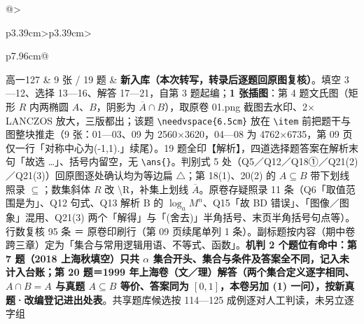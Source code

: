 \documentclass[a4paper,11pt]{article}
\begin{document}
\begin{xltabular}{\textwidth}{@{}>{\raggedright\arraybackslash}p{3.39cm}>{\centering\arraybackslash}p{3.39cm}>{\raggedright\arraybackslash}p{7.96cm}@{}}
高一127 & 9 张 / 19 题 & \textbf{新入库（本次转写，转录后逐题回原图复核）}。填空 3---12、选择 13---16、解答 17---21，自第 3 题起编；\textbf{1 张插图}：第 4 题文氏图（矩形 \(R\) 内两椭圆 \(A\)、\(B\)，阴影为 \(\overline A\cap\allowbreak  B\)），取原卷 01.png 截图去水印、2$\times$ LANCZOS 放大，三版都出；该题 \texttt{\textbackslash{}needvspace\{6.5cm\}} 放在 \texttt{\textbackslash{}item} 前把题干与图整块推走（9 张：01---03、09 为 2560$\times$3620，04---08 为 4762$\times$6735，第 09 页仅一行「对称中心为(-1,1).」续尾）。19 题全印【解析】，四道选择题答案在解析末句「故选 \ldots」、括号内留空，无 \texttt{\textbackslash{}ans\{\}}。判别式 5 处（Q5／Q12／Q18①／Q21(2)／Q21(3)）回原图逐处确认均为等边扁 \(\triangle\)；第 18(1)、20(2) 的 \(A\subseteq\allowbreak  B\) 带下划线照录 \(\subseteq\allowbreak \)；数集斜体 \(R\) 改 \textbackslash R，补集上划线 \(\overline{A}\)。原卷存疑照录 11 条（Q6「取值范围是为」、Q12 句式、Q13 解析 B 的 \(\log_a M^n\)、Q15「故 BD 错误」、「图像／图象」混用、Q21(3) 两个「解得」与「(舍去)」半角括号、末页半角括号句点等）。行数复核 95 条 ＝ 原卷印刷行（第 09 页续尾单列 1 条）。副标题按内容（期中卷跨三章）定为「集合与常用逻辑用语、不等式、函数」。\textbf{机判 2 个题位有命中：第 7 题（2018 上海秋填空）只共 \(\alpha\) 集合开头、集合与条件及答案全不同，记入未计入台账；第 20 题＝1999 年上海卷（文／理）解答（两个集合定义逐字相同、\(A\cap\allowbreak  B=A\) 与真题 \(A\subseteq\allowbreak  B\) 等价、答案同为 \([0,\allowbreak 1]\)，本卷另加 (1) 一问），按新真题·改编登记进出处表}。共享题库候选按 114---125 成例逐对人工判读，未另立逐字组 \\ \addlinespace[1pt]

\end{xltabular}
\end{document}
